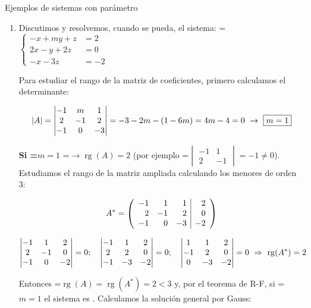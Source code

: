 \documentclass[11pt,a4paper]{article}
\newcommand{\fmm}[1]{\setbox0=\hbox{$#1$}\ifdim\wd0>\linewidth\fmdisp{#1}\else\mbox{\box0}\fi}
\newcommand{\fmdisp}[1]{\[\setbox2=\hbox{$\displaystyle #1$}\ifdim\wd2>\linewidth\resizebox{\linewidth}{!}{\box2}\else\box2\fi\]}
\newcommand{\fmbadge}[2]{\tcbox[on line,colback=#1,colframe=#1,arc=2mm,boxsep=0pt,left=4pt,right=4pt,top=1.5pt,bottom=1.5pt]{\color{white}\footnotesize\bfseries #2}}
\begin{document}
\begin{fmex}{Ejemplos de sistemas con parámetro}
\begin{enumerate}[label=\textbf{\arabic*.},leftmargin=*]
\item Discutimos y resolvemos, cuando se pueda, el sistema: \fmm{\left\{\begin{aligned}-x+my+z&=2\\ 2x-y+2z&=0\\ -x-3z&=-2\end{aligned}\right.}

Para estudiar el rango de la matriz de coeficientes, primero calculamos el determinante:

\fmdisp{|A|=\begin{vmatrix}-1 & m & 1\\ 2 & -1 & 2\\ -1 & 0 & -3\end{vmatrix}=-3-2m-(1-6m)=4m-4=0\ \rightarrow\ \boxed{m=1}}

\textbf{Si \fmm{m=1}} \fmm{\rightarrow\operatorname{rg}(A)=2} (por ejemplo \fmm{\begin{vmatrix}-1 & 1\\ 2 & -1\end{vmatrix}=-1\neq0}). Estudiamos el rango de la matriz ampliada calculando los menores de orden 3:

\fmdisp{A^*=\left(\begin{array}{rrr|r}-1 & 1 & 1 & 2\\ 2 & -1 & 2 & 0\\ -1 & 0 & -3 & -2\end{array}\right)}

\fmdisp{\begin{vmatrix}-1 & 1 & 2\\ 2 & -1 & 0\\ -1 & 0 & -2\end{vmatrix}=0;\quad\begin{vmatrix}-1 & 1 & 2\\ 2 & 2 & 0\\ -1 & -3 & -2\end{vmatrix}=0;\quad\begin{vmatrix}1 & 1 & 2\\ -1 & 2 & 0\\ 0 & -3 & -2\end{vmatrix}=0\ \Rightarrow\ \operatorname{rg}(A^*)=2}

Entonces \fmm{\operatorname{rg}(A)=\operatorname{rg}(A^*)=2<3} y, por el teorema de R-F, si \fmm{m=1} el sistema es \fmbadge{fmev}{SCI}. Calculamos la solución general por Gauss:


\end{enumerate}
\end{fmex}
\end{document}
